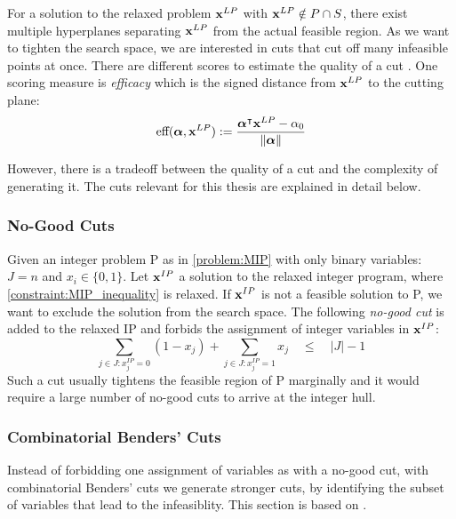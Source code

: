 For a solution to the relaxed problem $\bold x^{LP}$ with $\bold x^{LP} \notin P \cap S$, there exist multiple hyperplanes separating $\bold x^{LP}$ from the actual feasible region. %
As we want to tighten the search space, we are interested in cuts that cut off many infeasible points at once. There are different scores to estimate the quality of a cut \cite{turner_adaptive_2023}
. One scoring measure is \textit{efficacy} which is the signed distance from $\bold x^{LP}$ to the cutting plane:
\begin{equation}
    \text{eff}(\boldsymbol \alpha, \bold x^{LP}) := \frac{\boldsymbol \alpha^\intercal \bold x^{LP} - \alpha_0}{\lVert \boldsymbol \alpha \rVert}
\end{equation}

However, there is a tradeoff between the quality of a cut and the complexity of generating it.
The cuts relevant for this thesis are explained in detail below. 

\subsubsection{No-Good Cuts}
Given an integer problem P as in \cref{problem:MIP} with only binary variables: $J=n$ and $x_i \in \{0,1\}$. Let $\bold x^{IP}$ a solution to the relaxed integer program,  where \cref{constraint:MIP_inequality} is relaxed. 
If $\bold x^{IP}$ is not a feasible solution to P, we want to exclude the solution from the search space. The following \textit{no-good cut} is added to the relaxed IP and forbids the assignment of integer variables in $\bold x^{IP}$:
\begin{equation*}
    \sum_{j \in J: x_j^{IP}=0} (1 - x_{j}) + \sum_{j \in J: x_j^{IP}=1} x_j \quad \leq \quad |J| -1
\end{equation*}
Such a cut usually tightens the feasible region of P marginally and it would require a large number of no-good cuts to arrive at the integer hull.

\subsubsection{Combinatorial Benders' Cuts} \label{section:optimization_CB}
Instead of forbidding one assignment of variables as with a no-good cut, with combinatorial Benders' cuts we generate stronger cuts, by identifying the subset of variables that lead to the infeasiblity. This section is based on \cite{codato_combinatorial_2006}.

